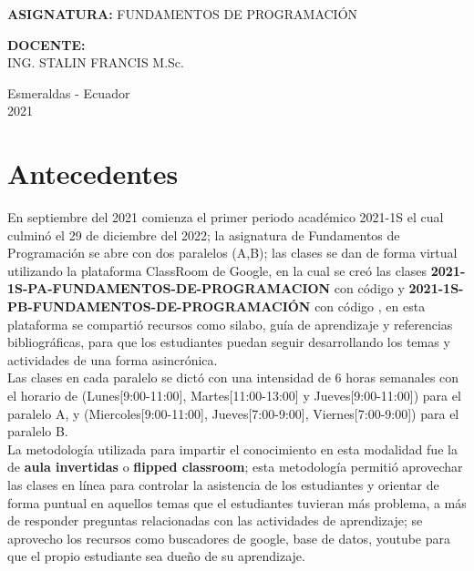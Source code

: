 \documentclass[a4pa<per,12pt,spanish]{article}
\begin{document}
\begin{titlepage}
{{\begin{minipage}[H]{0.3\linewidth}
\begin{center}
   { \large \textbf{ASIGNATURA:} FUNDAMENTOS DE PROGRAMACIÓN \par}

   \vspace{3cm}
   { \large \textbf{DOCENTE:}\\
     {\small ING. STALIN FRANCIS M.Sc.} \par}
   \vspace{2
     cm}

 \end{center}
 
  
  \begin{center}
  {\large Esmeraldas - Ecuador \\ 2021\par}
\end{center}
\vspace{1.8cm}
\end{minipage}
}
}




\end{titlepage}


\section{Antecedentes}
\label{sec:antecedente}

En  septiembre del 2021 comienza el primer periodo académico 2021-1S el cual culminó el 29 de diciembre del 2022; la asignatura de Fundamentos de Programación se abre con dos paralelos (A,B); las clases se dan de forma virtual utilizando la plataforma ClassRoom de Google, en la cual se creó las clases \textbf{2021-1S-PA-FUNDAMENTOS-DE-PROGRAMACION} con código  y \textbf{2021-1S-PB-FUNDAMENTOS-DE-PROGRAMACIÓN} con código , en esta plataforma se compartió recursos como silabo, guía de aprendizaje y referencias bibliográficas, para que los estudiantes puedan seguir desarrollando los temas y actividades de una forma asincrónica.\\

Las clases en cada paralelo se dictó con una intensidad  de 6 horas semanales con el horario de  (Lunes[9:00-11:00], Martes[11:00-13:00] y Jueves[9:00-11:00]) para el paralelo A, y  (Miercoles[9:00-11:00], Jueves[7:00-9:00], Viernes[7:00-9:00]) para el paralelo B.\\

La metodología utilizada para impartir el conocimiento en esta modalidad fue la de \textbf{aula invertidas} o \textbf{flipped classroom}; esta metodología permitió aprovechar las clases en línea para controlar la asistencia de los estudiantes y orientar de forma puntual en aquellos temas que el estudiantes tuvieran más problema, a más de responder preguntas relacionadas con las actividades de aprendizaje; se aprovecho los recursos como buscadores de google, base de datos, youtube  para que el propio estudiante sea dueño de su aprendizaje.\\
\end{document}
